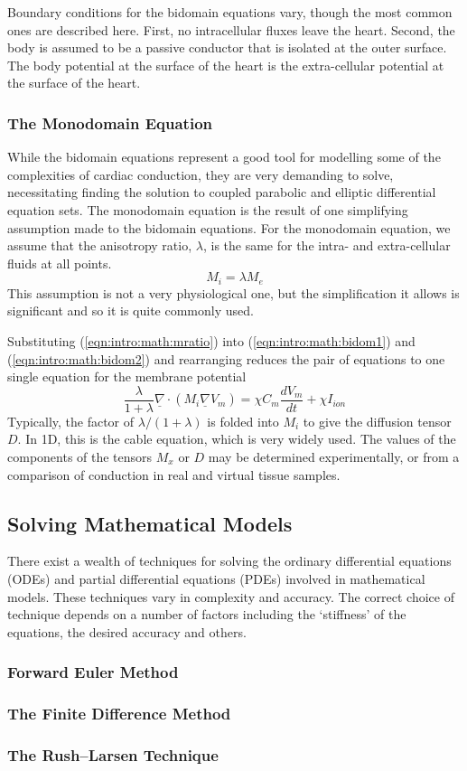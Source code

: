 Boundary conditions for the bidomain equations vary, though the most common ones are described here.
First, no intracellular fluxes leave the heart.
Second, the body is assumed to be a passive conductor that is isolated at the outer surface.
The body potential at the surface of the heart is the extra-cellular potential at the surface of the heart.

\subsubsection{The Monodomain Equation}

While the bidomain equations represent a good tool for modelling some of the complexities of cardiac conduction, they are very demanding to solve, necessitating finding the solution to coupled parabolic and elliptic differential equation sets.
The monodomain equation is the result of one simplifying assumption made to the bidomain equations.
For the monodomain equation, we assume that the anisotropy ratio, $\lambda$, is the same for the intra- and extra-cellular fluids at all points.
\begin{equation}
M_{i} = {\lambda}M_{e}
\label{eqn:intro:math:mratio}
\end{equation}
This assumption is not a very physiological one, but the simplification it
allows is significant and so it is quite commonly used.

Substituting (\ref{eqn:intro:math:mratio}) into (\ref{eqn:intro:math:bidom1})
and (\ref{eqn:intro:math:bidom2}) and rearranging reduces the pair of equations
to one single equation for the membrane potential
\begin{equation}
\frac{\lambda}{1+\lambda}\underline{\nabla}\cdot\left(M_{i}\underline{\nabla}V_{m}\right) = \chi C_{m}\frac{dV_{m}}{dt} + \chi{I_{ion}}
\label{eqn:intro:math:mono}
\end{equation}
Typically, the factor of ${\lambda}/\left({1+\lambda}\right)$ is folded into $M_{i}$ to give the diffusion tensor $D$.
In 1D, this is the cable equation, which is very widely used.
The values of the components of the tensors $M_{x}$ or $D$ may be determined experimentally, or from a comparison of conduction in real and virtual tissue samples.

\subsection{Solving Mathematical Models}

There exist a wealth of techniques for solving the ordinary differential
equations (ODEs) and partial differential equations (PDEs) involved in
mathematical models.
These techniques vary in complexity and accuracy.
The correct choice of technique depends on a number of factors including the
`stiffness' of the equations, the desired accuracy and others.

\subsubsection{Forward Euler Method}

\subsubsection{The Finite Difference Method}

\subsubsection{The Rush--Larsen Technique}
